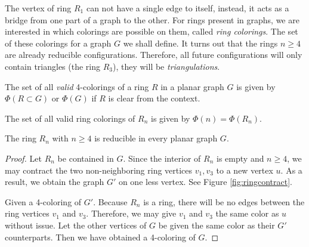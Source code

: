 The vertex of ring $R_1$ can not have a single edge to itself, instead, it acts as a bridge from one part of a graph to the other. For rings present in graphs, we are interested in which colorings are possible on them, called \textit{ring colorings}. The set of these colorings for a graph $G$ we shall define. It turns out that the rings $n\geq 4$ are already reducible configurations. Therefore, all future configurations will only contain triangles (the ring $R_3$), they will be \textit{triangulations}.


\begin{definition}
    The set of all \emph{valid} 4-colorings of a ring $R$ in a planar graph $G$ is given by $\Phi(R \subset G)$ or $\Phi(G)$ if $R$ is clear from the context. 
\end{definition}
\begin{definition}
    The set of all valid ring colorings of $R_n$ is given by $\Phi(n) = \Phi(R_n)$.
\end{definition}

\begin{theorem}
    \label{thm:ringsarered}
    The ring $R_n$ with $n\geq 4$ is reducible in every planar graph $G$.
\end{theorem}

\begin{proof}
Let $R_n$ be contained in $G$. Since the interior of $R_n$ is empty and $n\geq4$, we may contract the two non-neighboring ring vertices $v_1, v_3$ to a new vertex $u$. As a result, we obtain the graph $G'$ on one less vertex. See Figure \ref{fig:ringcontract}.

Given a 4-coloring of $G'$. Because $R_n$ is a ring, there will be no edges between the ring vertices $v_1$ and $v_3$. Therefore, we may give $v_1$ and $v_3$ the same color as $u$ without issue. Let the other vertices of $G$ be given the same color as their $G'$ counterparts. Then we have obtained a 4-coloring of $G$.

\end{proof}

